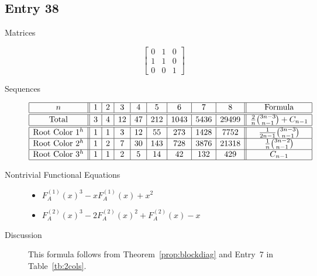 \documentclass[12pt]{amsart}
\newcommand{\gff}[2]{F_{#2}^{(#1)}(x)}
\newcommand{\gfa}[1]{\gff{#1}{A}}
\begin{document}
\subsection*{Entry 38}
\begin{description}
    \item[Matrices]
    
    \[\begin{bmatrix}
0 & 1 & 0 \\
1 & 1 & 0 \\
0 & 0 & 1
\end{bmatrix}\]
    \item[Sequences]\hspace*{\fill}\vspace{-0.5cm}
    \begin{center}
        \[
        \begin{array}{|c||c|c|c|c|c|c|c|c||c|}\hline
           n  & 1 & 2 & 3 & 4 & 5 & 6 & 7 & 8  & \text{Formula}\\\hline\hline
           \text{Total}  & 3 & 4 & 12 & 47 & 212 & 1043 & 5436 & 29499 & \frac{2}{n}\binom{3n-3}{n-1}+C_{n-1}\\\hline\hline
           \text{Root Color }1^{h} & 1 & 1 & 3 & 12 & 55 & 273 & 1428 & 7752 & \frac{1}{2n-1}\binom{3n-3}{n-1}\\\hline
           \text{Root Color }2^{h} & 1 & 2 & 7 & 30 & 143 & 728 & 3876 & 21318 & \frac{1}{n}\binom{3n-2}{n-1}\\\hline
           \text{Root Color }3^{h} & 1 & 1 & 2 & 5 & 14 & 42 & 132 & 429 & C_{n-1}\\\hline
        \end{array}
        \]
    \end{center}
    
    \item[Nontrivial Functional Equations]\hspace*{\fill}

    \begin{itemize}
\item $\gfa{1}^3-x\gfa{1}+x^2$


\item $\gfa{2}^3-2\gfa{2}^2+\gfa{2}-x$


\end{itemize}

\item[Discussion] This formula follows from Theorem~\ref{prop:blockdiag} and Entry~7 in Table~\ref{tb:2cols}.
    
\end{description}
\end{document}
